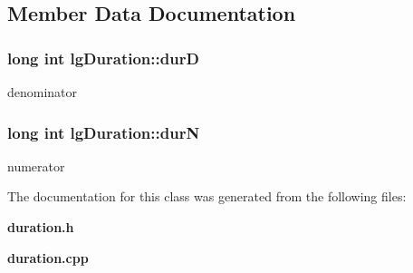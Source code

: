 \subsection{Member Data Documentation}
\subsubsection{\setlength{\rightskip}{0pt plus 5cm}long int {\bf lg\-Duration::dur\-D}}\label{classlgDuration_o1}


denominator 

\subsubsection{\setlength{\rightskip}{0pt plus 5cm}long int {\bf lg\-Duration::dur\-N}}\label{classlgDuration_o0}


numerator 



The documentation for this class was generated from the following files:\begin{CompactItemize}
\item 
{\bf duration.h}\item 
{\bf duration.cpp}\end{CompactItemize}
